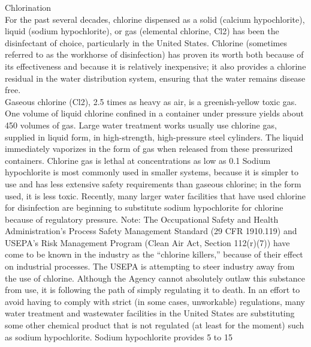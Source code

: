\documentclass{article}
\begin{document}
Chlorination\\
For the past several decades, chlorine dispensed as a solid (calcium hypochlorite), liquid (sodium hypochlorite), or gas (elemental chlorine, Cl2) has been the disinfectant of choice, particularly in the United States. Chlorine (sometimes referred to as the workhorse of disinfection) has proven its worth both because of its effectiveness and because it is relatively inexpensive; it also provides a chlorine residual in the water distribution system, ensuring that the water remains disease free.\\
Gaseous chlorine (Cl2), 2.5 times as heavy as air, is a greenish-yellow toxic gas. One volume of liquid chlorine confined in a container under pressure yields about 450 volumes of gas. Large water treatment works usually use chlorine gas, supplied in liquid form, in high-strength, high-pressure steel cylinders. The liquid immediately vaporizes in the form of gas when released from these pressurized containers. Chlorine gas is lethal at concentrations as low as 0.1%
Sodium hypochlorite is most commonly used in smaller systems, because it is simpler to use and has less extensive safety requirements than gaseous chlorine; in the form used, it is less toxic. Recently, many larger water facilities that have used chlorine for disinfection are beginning to substitute sodium hypochlorite for chlorine because of regulatory pressure.
Note: The Occupational Safety and Health Administration’s Process Safety Management Standard (29 CFR 1910.119) and USEPA’s Risk Management Program (Clean Air Act, Section 112(r)(7)) have come to be known in the industry as the “chlorine killers,” because of their effect on industrial processes. The USEPA is attempting to steer industry away from the use of chlorine. Although the Agency cannot absolutely outlaw this substance from use, it is following the path of simply regulating it to death. In an effort to avoid having to comply with strict (in some cases, unworkable) regulations, many water treatment and wastewater facilities in the United States are substituting some other chemical product that is not regulated (at least for the moment) such as sodium hypochlorite. Sodium hypochlorite provides 5 to 15%
\end{document}
